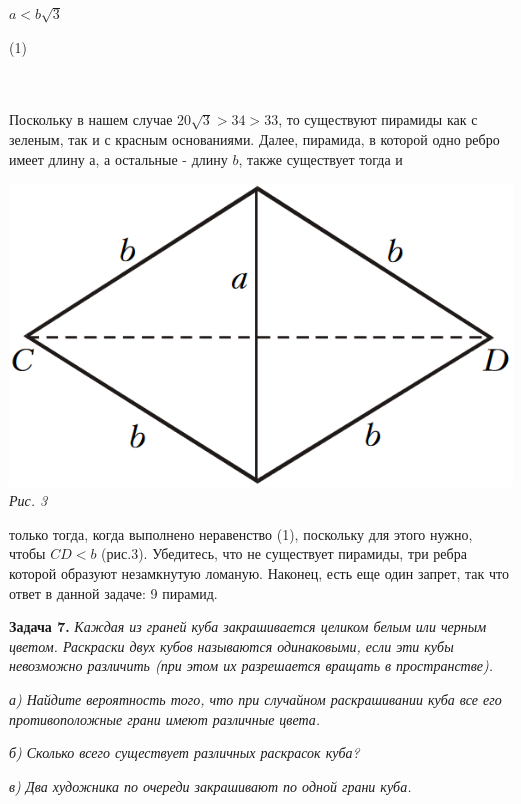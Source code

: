 \documentclass{article}
\begin{document}
\begin{multicols}{3}
\begin{minipage}[b]{0.16666\textwidth}
\raggedleft
$a < b\sqrt{3}$
\end{minipage}%
\begin{minipage}[b]{0.12\textwidth}
\raggedleft
(1)
\end{minipage}%
\\ \\
Поскольку в нашем случае $20\sqrt{3} > 34 > 33$, то существуют пирамиды как
с зеленым, так и с красным
\vfill\null
\columnbreak
основаниями. Далее, пирамида, в которой одно ребро имеет длину $а$, а остальные -
длину $b$, также существует тогда и
\begin{minipage}{\linewidth}
\includegraphics[width=\linewidth]{images/picture3.png} \\
\textsl{Рис. 3} \\
\end{minipage}
только тогда, когда выполнено неравенство (1),
поскольку для этого нужно, чтобы
$CD < b$
(рис.3). Убедитесь, что не существует пирамиды, три ребра
которой образуют незамкнутую ломаную. Наконец, есть еще один запрет,
так что ответ в данной задаче: 9 пирамид.\par
\textbf{Задача 7.} \textsl{Каждая из граней куба закрашивается целиком
белым или черным цветом. Раскраски двух кубов называются одинаковыми,
если эти кубы невозможно различить (при этом их разрешается
вращать в пространстве).} \par
\textsl{а) Найдите вероятность того, что при случайном раскрашивании куба все
его противоположные грани имеют различные цвета.} \par
\textsl{б) Сколько всего существует различных раскрасок куба?} \par
\textsl{в) Два художника по очереди закрашивают по одной грани куба.
}
\end{multicols}
\end{document}
